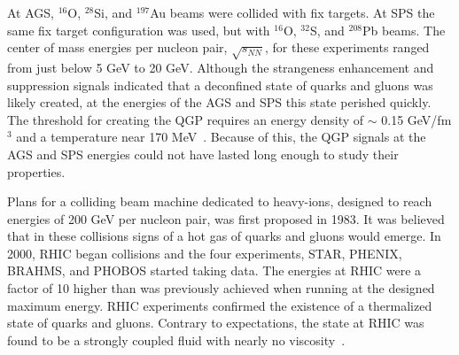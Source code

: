   At AGS, $^{16}$O, $^{28}$Si, and $^{197}$Au beams were 
    collided with fix targets. 
  At SPS the same fix target configuration was used, but with 
    $^{16}$O, $^{32}$S, and $^{208}$Pb beams.
  The center of mass energies per nucleon pair, $\sqrt{s_{NN}}$, for these 
    experiments ranged from just below 5 GeV to 20 GeV. 
  Although the strangeness enhancement and \JPsi{} suppression 
    signals indicated that a deconfined state of quarks and gluons was likely 
    created, at the energies of the AGS and SPS this state perished quickly. 
  The threshold for creating the QGP requires an energy density of $\sim$ 0.15 
    GeV/fm$^{3}$ and a temperature near 170 MeV~\cite{Karsch:2000kv,Hands:2001ve}.
  Because of this, the QGP signals at the AGS and SPS energies could 
    not have lasted long enough to study their properties. 

  Plans for a colliding beam machine dedicated to heavy-ions, designed to reach 
    energies of 200 GeV per nucleon pair, was first proposed in 1983.
  It was believed that in these collisions signs of a hot gas of quarks and 
    gluons would emerge.
  In 2000, RHIC began collisions and the four experiments,
    STAR, PHENIX, BRAHMS, and PHOBOS started taking data. 
  The energies at RHIC were a factor of 10 higher than was previously achieved
    when running at the designed maximum energy. 
  RHIC experiments confirmed the existence of a thermalized state of quarks and 
    gluons.
  Contrary to expectations, the state at RHIC was found to be 
    a strongly coupled fluid with nearly no viscosity~\cite{longrage2008}.

